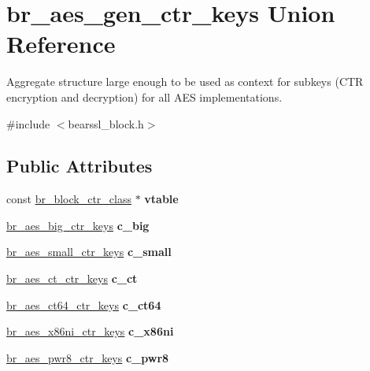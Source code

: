 \hypertarget{unionbr__aes__gen__ctr__keys}{}\section{br\+\_\+aes\+\_\+gen\+\_\+ctr\+\_\+keys Union Reference}
\label{unionbr__aes__gen__ctr__keys}


Aggregate structure large enough to be used as context for subkeys (C\+TR encryption and decryption) for all A\+ES implementations.  




{\ttfamily \#include $<$bearssl\+\_\+block.\+h$>$}

\subsection*{Public Attributes}
\begin{DoxyCompactItemize}
\item 
\mbox{\label{unionbr__aes__gen__ctr__keys_ad8ace3d6902de65213c50bf6075c2041}} 
const \hyperlink{bearssl__block_8h_a8934ac58af503220bfb6e6cbc2cfb209}{br\+\_\+block\+\_\+ctr\+\_\+class} $\ast$ {\bfseries vtable}
\item 
\mbox{\label{unionbr__aes__gen__ctr__keys_a35f2470b03805f986100b61a0433e1ed}} 
\hyperlink{structbr__aes__big__ctr__keys}{br\+\_\+aes\+\_\+big\+\_\+ctr\+\_\+keys} {\bfseries c\+\_\+big}
\item 
\mbox{\label{unionbr__aes__gen__ctr__keys_a40f1253912f9733747e470e4520a768b}} 
\hyperlink{structbr__aes__small__ctr__keys}{br\+\_\+aes\+\_\+small\+\_\+ctr\+\_\+keys} {\bfseries c\+\_\+small}
\item 
\mbox{\label{unionbr__aes__gen__ctr__keys_a44dad67f4f71d2a2bbef435c39df6d9a}} 
\hyperlink{structbr__aes__ct__ctr__keys}{br\+\_\+aes\+\_\+ct\+\_\+ctr\+\_\+keys} {\bfseries c\+\_\+ct}
\item 
\mbox{\label{unionbr__aes__gen__ctr__keys_a56915b960bd4b520af67fcb0842e322d}} 
\hyperlink{structbr__aes__ct64__ctr__keys}{br\+\_\+aes\+\_\+ct64\+\_\+ctr\+\_\+keys} {\bfseries c\+\_\+ct64}
\item 
\mbox{\label{unionbr__aes__gen__ctr__keys_afe7756e936e943f0ad4b767246deb166}} 
\hyperlink{structbr__aes__x86ni__ctr__keys}{br\+\_\+aes\+\_\+x86ni\+\_\+ctr\+\_\+keys} {\bfseries c\+\_\+x86ni}
\item 
\mbox{\label{unionbr__aes__gen__ctr__keys_a8b9aa4ee481702666688364452772b65}} 
\hyperlink{structbr__aes__pwr8__ctr__keys}{br\+\_\+aes\+\_\+pwr8\+\_\+ctr\+\_\+keys} {\bfseries c\+\_\+pwr8}
\end{DoxyCompactItemize}


